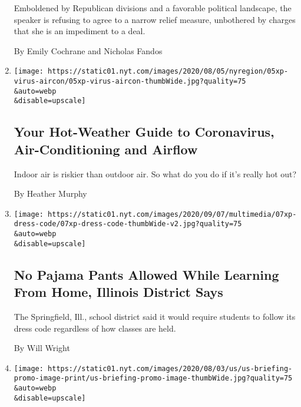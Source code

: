 \begin{enumerate}
  Emboldened by Republican divisions and a favorable political
  landscape, the speaker is refusing to agree to a narrow relief
  measure, unbothered by charges that she is an impediment to a deal.

  By Emily Cochrane and Nicholas Fandos
\item
  \href{/2020/08/08/science/coronavirus-spread-air-conditioning.html}{}

  \texttt{[image: https://static01.nyt.com/images/2020/08/05/nyregion/05xp-virus-aircon/05xp-virus-aircon-thumbWide.jpg?quality=75\\\&auto=webp\\\&disable=upscale]}

  \hypertarget{your-hot-weather-guide-to-coronavirus-air-conditioning-and-airflow}{%
  \subsection{Your Hot-Weather Guide to Coronavirus, Air-Conditioning
  and
  Airflow}\label{your-hot-weather-guide-to-coronavirus-air-conditioning-and-airflow}}

  Indoor air is riskier than outdoor air. So what do you do if it's
  really hot out?

  By Heather Murphy
\item
  \href{/2020/08/08/us/pajamas-school-springfield-dress-code.html}{}

  \texttt{[image: https://static01.nyt.com/images/2020/09/07/multimedia/07xp-dress-code/07xp-dress-code-thumbWide-v2.jpg?quality=75\\\&auto=webp\\\&disable=upscale]}

  \hypertarget{no-pajama-pants-allowed-while-learning-from-home-illinois-district-says}{%
  \subsection{No Pajama Pants Allowed While Learning From Home, Illinois
  District
  Says}\label{no-pajama-pants-allowed-while-learning-from-home-illinois-district-says}}

  The Springfield, Ill., school district said it would require students
  to follow its dress code regardless of how classes are held.

  By Will Wright
\item
  \href{/2020/08/08/world/coronavirus-updates.html}{}

  \texttt{[image: https://static01.nyt.com/images/2020/08/03/us/us-briefing-promo-image-print/us-briefing-promo-image-thumbWide.jpg?quality=75\\\&auto=webp\\\&disable=upscale]}


\end{enumerate}
